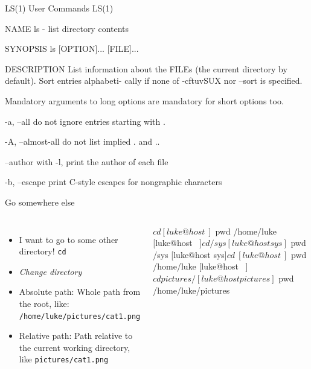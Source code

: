     \begin{frame}[t,fragile]{}
        \begin{bashenv}[\tiny]
LS(1)                                        User Commands                                       LS(1)

NAME
       ls - list directory contents

SYNOPSIS
       ls [OPTION]... [FILE]...

DESCRIPTION
       List  information  about the FILEs (the current directory by default).  Sort entries alphabeti-
       cally if none of -cftuvSUX nor --sort is specified.

       Mandatory arguments to long options are mandatory for short options too.

       -a, --all
              do not ignore entries starting with .

       -A, --almost-all
              do not list implied . and ..

       --author
              with -l, print the author of each file

       -b, --escape
              print C-style escapes for nongraphic characters
        \end{bashenv}
    \end{frame}

    \begin{frame}[t,fragile]{Go somewhere else}
        \begin{columns}[T]
            \begin{itemize}
                \item I want to go to some other directory! \textrightarrow \: \texttt{cd}
                \item \emph{Change directory}
                \item Absolute path: Whole path from the root, like:
                    \texttt{/home/luke/pictures/cat1.png}
                \item Relative path: Path relative to the current working
                    directory, like \texttt{pictures/cat1.png}
            \end{itemize}
            \begin{bashenv}$ cd
[luke@host ~]$ pwd
/home/luke
[luke@host ~]$ cd /sys
[luke@host sys]$ pwd
/sys
[luke@host sys]$ cd ~
[luke@host ~]$ pwd
/home/luke
[luke@host ~]$ cd pictures/
[luke@host pictures]$ pwd
/home/luke/pictures
            \end{bashenv}
        \end{columns}
    \end{frame}


